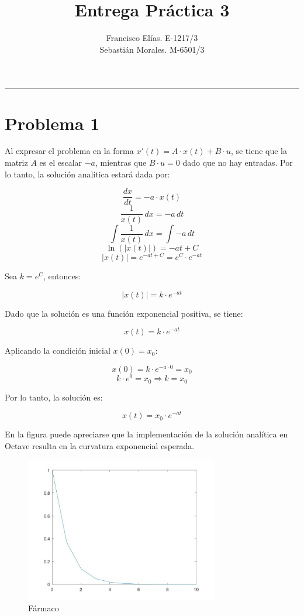 \documentclass[a4paper,12pt]{article}
\title{Entrega Práctica 3}
\author{
  Francisco Elías. E-1217/3 \\
  Sebastián Morales. M-6501/3
}
\date{}
\begin{document}
\maketitle
\hrule
\vspace{1em}


\section*{Problema 1}

Al expresar el problema en la forma \( x'(t) = A \cdot x(t) + B \cdot u \), se tiene que la matriz \( A \) es el escalar \( -a \), mientras que \( B \cdot u = 0 \) dado que no hay entradas. Por lo tanto, la solución analítica estará dada por:

\[
\frac{dx}{dt} = -a \cdot x(t)
\]
\[
\frac{1}{x(t)} \, dx = -a \, dt
\]
\[
\int \frac{1}{x(t)} \, dx = \int -a \, dt
\]
\[
\ln(|x(t)|) = -a t + C
\]
\[
|x(t)| = e^{-a t + C} = e^C \cdot e^{-a t}
\]

Sea \( k = e^C \), entonces:

\[
|x(t)| = k \cdot e^{-a t}
\]

Dado que la solución es una función exponencial positiva, se tiene:

\[
x(t) = k \cdot e^{-a t}
\]

Aplicando la condición inicial \( x(0) = x_0 \):

\[
x(0) = k \cdot e^{-a \cdot 0} = x_0
\]
\[
k \cdot e^0 = x_0 \Rightarrow k = x_0
\]

Por lo tanto, la solución es:

\[
x(t) = x_0 \cdot e^{-a t}
\]


En la figura puede apreciarse que la implementación de la solución analítica en Octave resulta en la curvatura exponencial esperada.

\begin{figure}[H]
\centering
\includegraphics[width=0.75\textwidth]{img/ej1.jpeg}
\caption{Fármaco}
\end{figure}
\end{document}
